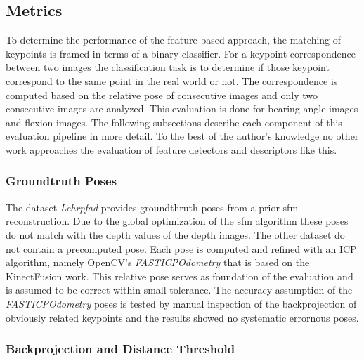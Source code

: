 \subsection{Metrics}

To determine the performance of the feature-based approach, the matching of keypoints is framed in terms of a binary classifier.
For a keypoint correspondence between two images the classification task is to determine if those keypoint correspond to the same point in the real world or not.
The correspondence is computed based on the relative pose of consecutive images and only two consecutive images are analyzed.
This evaluation is done for \Glspl{bearing-angle-image} and \Glspl{flexion-image}.
The following subsections describe each component of this evaluation pipeline in more detail.
To the best of the author's knowledge no other work approaches the evaluation of feature detectors and descriptors like this.

\subsubsection{Groundtruth Poses}

The dataset \emph{Lehrpfad} provides groundthruth poses from a prior \gls{sfm} reconstruction.
Due to the global optimization of the \gls{sfm} algorithm these poses do not match with the depth values of the depth images.
The other dataset do not contain a precomputed pose.
Each pose is computed and refined with an ICP algorithm, namely OpenCV's \emph{FASTICPOdometry} that is based on the KinectFusion\cite{newcombe_ismar2011} work.
This relative pose serves as foundation of the evaluation and is assumed to be correct within small tolerance.
The accuracy assumption of the \emph{FASTICPOdometry} poses is tested by manual inspection of the backprojection of obviously related keypoints and the results showed no systematic errornous poses.

\subsubsection{Backprojection and Distance Threshold}

